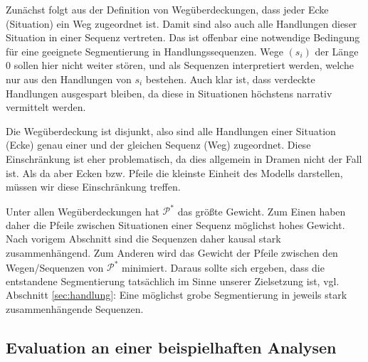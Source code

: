 \documentclass[a4paper,10pt,abstract=true,headings=small]{scrartcl}
\begin{document}
\begin{enumerate*}[itemjoin=\\\hspace*{\parindent}] %
    \item Zunächst folgt aus der Definition von Wegüberdeckungen, dass jeder Ecke (Situation) ein Weg zugeordnet ist.
        Damit sind also auch alle Handlungen dieser Situation in einer Sequenz vertreten.
        Das ist offenbar eine notwendige Bedingung für eine geeignete Segmentierung in Handlungssequenzen.
        Wege $(s_i)$ der Länge 0 sollen hier nicht weiter stören, und als Sequenzen interpretiert werden, welche nur aus den Handlungen von $s_i$ bestehen.
        Auch klar ist, dass verdeckte Handlungen ausgespart bleiben, da diese in Situationen höchstens narrativ vermittelt werden. 

    \item Die Wegüberdeckung ist disjunkt, also sind alle Handlungen einer Situation (Ecke) genau einer und der gleichen Sequenz (Weg) zugeordnet. 
        Diese Einschränkung ist eher problematisch, da dies allgemein in Dramen nicht der Fall ist.
        Als da aber Ecken bzw. Pfeile die kleinste Einheit des Modells darstellen, müssen wir diese Einschränkung treffen.

    \item Unter allen Wegüberdeckungen hat $\mathcal{P}^*$ das größte Gewicht.
        Zum Einen haben daher die Pfeile zwischen Situationen einer Sequenz möglichst hohes Gewicht.
        Nach vorigem Abschnitt sind die Sequenzen daher kausal stark zusammenhängend.
        Zum Anderen wird das Gewicht der Pfeile zwischen den Wegen/Sequenzen von $\mathcal{P}^*$ minimiert.
        Daraus sollte sich ergeben, dass die entstandene Segmentierung tatsächlich  im Sinne unserer Zielsetzung ist, vgl. Abschnitt \ref{sec:handlung}:
        Eine möglichst grobe Segmentierung in jeweils stark zusammenhängende Sequenzen.
\end{enumerate*}




\subsection{Evaluation an einer beispielhaften Analysen}

\end{document}
